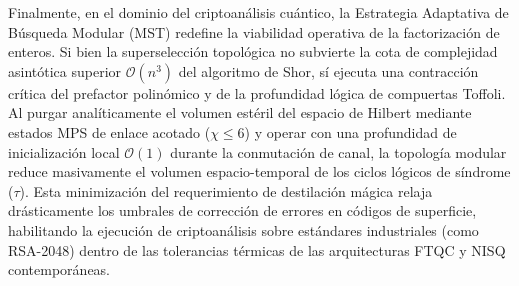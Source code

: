 \documentclass[12pt,a4paper]{article}
\theoremstyle{plain}
\theoremstyle{definition}
\theoremstyle{remark}
\begin{document}
Finalmente, en el dominio del criptoanálisis cuántico, la Estrategia Adaptativa de Búsqueda Modular (MST) redefine la viabilidad operativa de la factorización de enteros. Si bien la superselección topológica no subvierte la cota de complejidad asintótica superior $\mathcal{O}(n^3)$ del algoritmo de Shor, sí ejecuta una contracción crítica del prefactor polinómico y de la profundidad lógica de compuertas Toffoli. Al purgar analíticamente el volumen estéril del espacio de Hilbert mediante estados MPS de enlace acotado ($\chi \le 6$) y operar con una profundidad de inicialización local $\mathcal{O}(1)$ durante la conmutación de canal, la topología modular reduce masivamente el volumen espacio-temporal de los ciclos lógicos de síndrome ($\tau$). Esta minimización del requerimiento de destilación mágica relaja drásticamente los umbrales de corrección de errores en códigos de superficie, habilitando la ejecución de criptoanálisis sobre estándares industriales (como RSA-2048) dentro de las tolerancias térmicas de las arquitecturas FTQC y NISQ contemporáneas.
\end{document}
